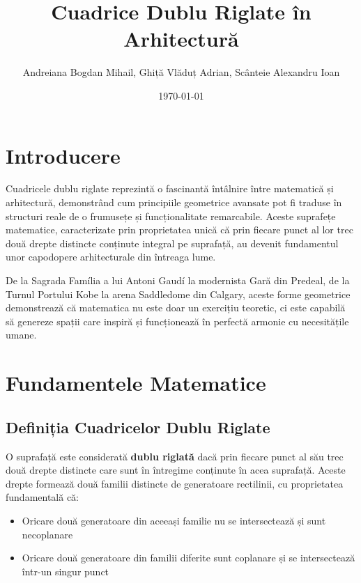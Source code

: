 \documentclass[12pt,a4paper]{article}
\title{\textbf{Cuadrice Dublu Riglate în Arhitectură}}
\author{Andreiana Bogdan Mihail, Ghiță Vlăduț Adrian, Scânteie Alexandru Ioan}
\date{\today}
\begin{document}
\maketitle
\thispagestyle{empty}
\newpage

\tableofcontents
\newpage

\section{Introducere}

Cuadricele dublu riglate reprezintă o fascinantă întâlnire între matematică și arhitectură, demonstrând cum principiile geometrice avansate pot fi traduse în structuri reale de o frumusețe și funcționalitate remarcabile. Aceste suprafețe matematice, caracterizate prin proprietatea unică că prin fiecare punct al lor trec două drepte distincte conținute integral pe suprafață, au devenit fundamentul unor capodopere arhitecturale din întreaga lume.

De la Sagrada Família a lui Antoni Gaudí la modernista Gară din Predeal, de la Turnul Portului Kobe la arena Saddledome din Calgary, aceste forme geometrice demonstrează că matematica nu este doar un exercițiu teoretic, ci este capabilă să genereze spații care inspiră și funcționează în perfectă armonie cu necesitățile umane.

\section{Fundamentele Matematice}

\subsection{Definiția Cuadricelor Dublu Riglate}

O suprafață este considerată \textbf{dublu riglată} dacă prin fiecare punct al său trec două drepte distincte care sunt în întregime conținute în acea suprafață. Aceste drepte formează două familii distincte de generatoare rectilinii, cu proprietatea fundamentală că:

\begin{itemize}
    \item Oricare două generatoare din aceeași familie nu se intersectează și sunt necoplanare
    \item Oricare două generatoare din familii diferite sunt coplanare și se intersectează într-un singur punct
\end{itemize}
\end{document}
